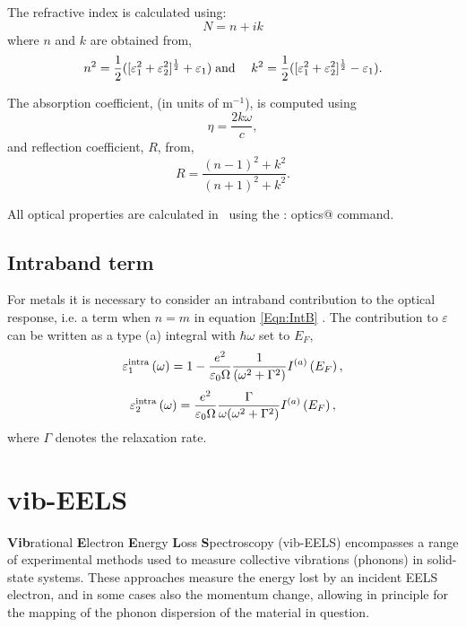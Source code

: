 \documentclass[a4paper,11pt,twoside]{book}
\begin{document}
{The refractive index is calculated using:
\begin{equation}
N=n+ik
\end{equation}
where $n$ and $k$ are obtained from,
\begin{eqnarray}
n^2=\frac{1}{2}([\varepsilon_1^2+\varepsilon_2^2]^{\frac{1}{2}}+\varepsilon_1)
& {\rm \;and\;}&
k^2=\frac{1}{2}([\varepsilon_1^2+\varepsilon_2^2]^{\frac{1}{2}}-\varepsilon_1).
\end{eqnarray}


The absorption coefficient, (in units of m$^{-1}$), is computed using
\begin{equation}
\eta = \frac{2k\omega}{c},
\end{equation}
and reflection coefficient, $R$, from,
\begin{equation}
R= \frac{(n-1)^2 + k^2}{(n+1)^2+k^2}.
\end{equation}

All optical properties are calculated in \optados\ using the \verb@task : optics@ command.

\subsection{Intraband term}
For metals it is necessary to consider an intraband contribution to
the optical response, i.e. a term when $n = m$ in equation
\ref{Eqn:IntB}  \cite{dressel,draxl}.  The contribution to
$\varepsilon$ can be written as a type (a) integral with $\hbar\omega$
set to $E_F$,
\begin{equation}
\varepsilon_1^{\rm{intra}} \left ( \omega \right ) = 1 - \frac{e^2}{\varepsilon_0 \Omega} \frac{1}{(\omega^2+\Gamma^2)} I^{(a)}\left ( E_F \right ),
\end{equation}
\begin{equation}
\varepsilon_2^{\rm{intra}} \left ( \omega \right ) = \frac{e^2}{\varepsilon_0 \Omega}\frac{\Gamma}{\omega (\omega^2+\Gamma^2)} I^{(a)}\left ( E_F \right ),
\end{equation}
where $\Gamma$ denotes the relaxation rate.

\section{vib-EELS}

\textbf{Vib}rational \textbf{E}lectron \textbf{E}nergy \textbf{L}oss \textbf{S}pectroscopy (vib-EELS) encompasses a range of experimental methods used to measure collective vibrations (phonons) in solid-state systems. These approaches measure the energy lost by an incident EELS electron, and in some cases also the momentum change, allowing in principle for the mapping of the phonon dispersion of the material in question.

}
\end{document}
